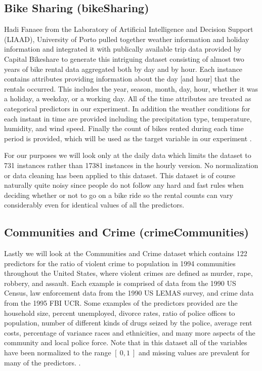 \documentclass[9pt, conference]{IEEEtran}
\begin{document}
\subsection{Bike Sharing (bikeSharing)}
Hadi Fanaee from the Laboratory of Artificial Intelligence and Decision Support (LIAAD), University of Porto pulled together weather information and holiday information and integrated it with publically available trip data provided by Capital Bikeshare to generate this intriguing dataset consisting of almost two years of bike rental data aggregated both by day and by hour. Each instance contains attributes providing information about the day [and hour] that the rentals occurred. This includes the year, season, month, day, hour, whether it was a holiday, a weekday, or a working day. All of the time attributes are treated as categorical predictors in our experiment. In addition the weather conditions for each instant in time are provided including the precipitation type, temperature, humidity, and wind speed. Finally the count of bikes rented during each time period is provided, which will be used as the target variable in our experiment \cite{bikeSharingDataset} \cite{bikeSharingCiteRequest}. 

For our purposes we will look only at the daily data which limits the dataset to 731 instances rather than 17381 instances in the hourly version. No normalization or data cleaning has been applied to this dataset. This dataset is of course naturally quite noisy since people do not follow any hard and fast rules when deciding whether or not to go on a bike ride so the rental counts can vary considerably even for identical values of all the predictors.

\subsection{Communities and Crime (crimeCommunities)}
Lastly we will look at the Communities and Crime dataset which contains 122 predictors for the ratio of violent crime to population in 1994 communities throughout the United States, where violent crimes are defined as murder, rape, robbery, and assault. Each example is comprised of data from the 1990 US Census, law enforcement data from the 1990 US LEMAS survey, and crime 
data from the 1995 FBI UCR. Some examples of the predictors provided are the household size, percent unemployed, divorce rates, ratio of police offices to population, number of different kinds of drugs seized by the police, average rent costs, percentage of variance races and ethnicities, and many more aspects of the community and local police force. Note that in this dataset all of the variables have been normalized to the range \([\ 0, 1\ ]\) and missing values are prevalent for many of the predictors. \cite{crimeCommunitiesDataset} \cite{crimeCommunitiesCiteRequest1} \cite{crimeCommunitiesCiteRequest2} \cite{crimeCommunitiesCiteRequest3} \cite{crimeCommunitiesCiteRequest4} \cite{crimeCommunitiesCiteRequest5}.
\end{document}
